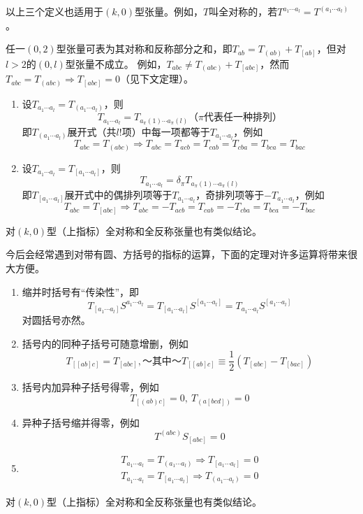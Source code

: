 以上三个定义也适用于$(k, 0)$型张量。例如，$T$叫全对称的，若$T^{a_1 \cdots a_l} = T^{(a_1 \cdots a_l)}$。

\begin{note}
任一$(0, 2)$型张量可表为其对称和反称部分之和，即$T_{ab} = T_{(ab)} + T_{[ab]}$，但对$l > 2$的$(0, l)$型张量不成立。
例如，$T_{abc} \neq T_{(abc)} + T_{[abc]}$，然而$T_{abc} = T_{(abc)} \Rightarrow T_{[abc]} = 0$（见下文定理）。
\end{note}

\begin{theorem}
\begin{enumerate}[（a）]
\item 设$T_{a_1 \cdots a_l} = T_{(a_1 \cdots a_l)}$，则
$$T_{a_1 \cdots a_l} = T_{a_\pi(1) \cdots a_\pi(l)}\text{（$\pi$代表任一种排列）}$$
即$T_{(a_1 \cdots a_l)}$展开式（共$l!$项）中每一项都等于$T_{a_1 \cdots a_l}$，例如
$$T_{abc} = T_{(abc)} \Rightarrow T_{abc} = T_{acb} = T_{cab} = T_{cba} = T_{bca} = T_{bac}$$
\item 设$T_{a_1 \cdots a_l} = T_{[a_1 \cdots a_l]}$，则
$$T_{a_1 \cdots a_l} = \delta_\pi T_{a_\pi(1) \cdots a_\pi(l)}$$
即$T_{[a_1 \cdots a_l]}$展开式中的偶排列项等于$T_{a_1 \cdots a_l}$，奇排列项等于$-T_{a_1 \cdots a_l}$，例如
$$T_{abc} = T_{[abc]} \Rightarrow T_{abc} = -T_{acb} = T_{cab} = -T_{cba} = T_{bca} = -T_{bac}$$
\end{enumerate}
对$(k, 0)$型（上指标）全对称和全反称张量也有类似结论。
\end{theorem}

今后会经常遇到对带有圆、方括号的指标的运算，下面的定理对许多运算将带来很大方便。

\begin{theorem}
\begin{enumerate}[（a）]
\item 缩并时括号有``传染性''，即
$$T_{[a_1 \cdots a_l]}S^{a_1 \cdots a_l} = T_{[a_1 \cdots a_l]}S^{[a_1 \cdots a_l]} = T_{a_1 \cdots a_l}S^{[a_1 \cdots a_l]}$$
对圆括号亦然。
\item 括号内的同种子括号可随意增删，例如
$$T_{[[ab]c]} = T_{[abc]}, ～ \text{其中} ～ T_{[[ab]c]} \equiv \frac{1}{2}(T_{[abc]} - T_{[bac]})$$
\item 括号内加异种子括号得零，例如
$$T_{[(ab)c]} = 0, ~ T_{(a[bcd])} = 0$$
\item 异种子括号缩并得零，例如
$$T^{(abc)}S_{[abc]} = 0$$
\item \begin{gather*}
T_{a_1 \cdots a_l} = T_{(a_1 \cdots a_l)} \Rightarrow T_{[a_1 \cdots a_l]} = 0 \\
T_{a_1 \cdots a_l} = T_{[a_1 \cdots a_l]} \Rightarrow T_{(a_1 \cdots a_l)} = 0
\end{gather*}
\end{enumerate}
对$(k, 0)$型（上指标）全对称和全反称张量也有类似结论。
\end{theorem}
